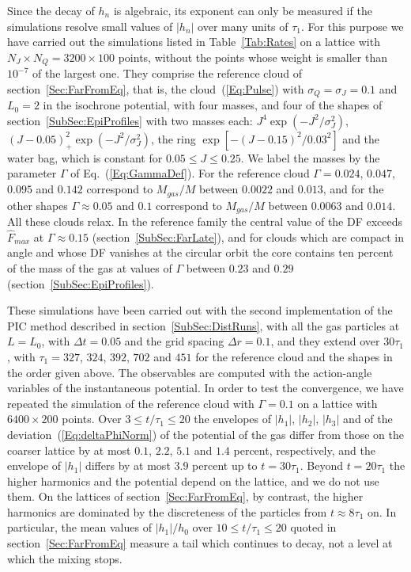 Since the decay of $h_n$ is algebraic, its exponent can only be measured if the simulations resolve small values of $|h_n|$ over many units of $\tau_1$. For this purpose we have carried out the simulations listed in Table~\ref{Tab:Rates} on a lattice with $N_J\times N_Q = 3200\times 100$ points, without the points whose weight is smaller than $10^{-7}$ of the largest one. They comprise the reference cloud of section~\ref{Sec:FarFromEq}, that is, the cloud~(\ref{Eq:Pulse}) with $\sigma_Q = \sigma_J = 0.1$ and $L_0 = 2$ in the isochrone potential, with four masses, and four of the shapes of section~\ref{SubSec:EpiProfiles} with two masses each: $J^4\exp(-J^2/\sigma_J^2)$, $(J - 0.05)_+^2\exp(-J^2/\sigma_J^2)$, the ring $\exp[-(J - 0.15)^2/0.03^2]$ and the water bag, which is constant for $0.05\leq J\leq 0.25$. We label the masses by the parameter $\Gamma$ of Eq.~(\ref{Eq:GammaDef}). For the reference cloud $\Gamma = 0.024$, $0.047$, $0.095$ and $0.142$ correspond to $M_{gas}/M$ between $0.0022$ and $0.013$, and for the other shapes $\Gamma\approx 0.05$ and $0.1$ correspond to $M_{gas}/M$ between $0.0063$ and $0.014$. All these clouds relax. In the reference family the central value of the DF exceeds $\hat{F}_{max}$ at $\Gamma\approx 0.15$ (section~\ref{SubSec:FarLate}), and for clouds which are compact in angle and whose DF vanishes at the circular orbit the core contains ten percent of the mass of the gas at values of $\Gamma$ between $0.23$ and $0.29$ (section~\ref{SubSec:EpiProfiles}).

These simulations have been carried out with the second implementation of the PIC method described in section~\ref{SubSec:DistRuns}, with all the gas particles at $L = L_0$, with $\Delta t = 0.05$ and the grid spacing $\Delta r = 0.1$, and they extend over $30\tau_1$, with $\tau_1 = 327$, $324$, $392$, $702$ and $451$ for the reference cloud and the shapes in the order given above. The observables are computed with the action-angle variables of the instantaneous potential. In order to test the convergence, we have repeated the simulation of the reference cloud with $\Gamma = 0.1$ on a lattice with $6400\times 200$ points. Over $3\leq t/\tau_1\leq 20$ the envelopes of $|h_1|$, $|h_2|$, $|h_3|$ and of the deviation~(\ref{Eq:deltaPhiNorm}) of the potential of the gas differ from those on the coarser lattice by at most $0.1$, $2.2$, $5.1$ and $1.4$ percent, respectively, and the envelope of $|h_1|$ differs by at most $3.9$ percent up to $t = 30\tau_1$. Beyond $t = 20\tau_1$ the higher harmonics and the potential depend on the lattice, and we do not use them. On the lattices of section~\ref{Sec:FarFromEq}, by contrast, the higher harmonics are dominated by the discreteness of the particles from $t\approx 8\tau_1$ on. In particular, the mean values of $|h_1|/h_0$ over $10\leq t/\tau_1\leq 20$ quoted in section~\ref{Sec:FarFromEq} measure a tail which continues to decay, not a level at which the mixing stops.

